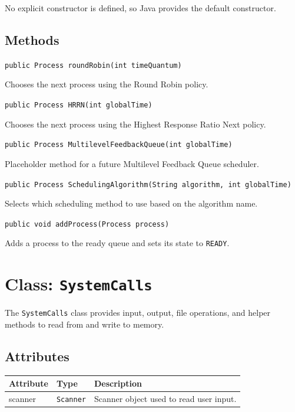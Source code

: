 \documentclass[12pt,a4paper]{article}
\begin{document}
No explicit constructor is defined, so Java provides the default constructor.

\subsection{Methods}

\begin{signaturebox}
\texttt{public Process roundRobin(int timeQuantum)}
\end{signaturebox}
Chooses the next process using the Round Robin policy.

\begin{signaturebox}
\texttt{public Process HRRN(int globalTime)}
\end{signaturebox}
Chooses the next process using the Highest Response Ratio Next policy.

\begin{signaturebox}
\texttt{public Process MultilevelFeedbackQueue(int globalTime)}
\end{signaturebox}
Placeholder method for a future Multilevel Feedback Queue scheduler.

\begin{signaturebox}
\texttt{public Process SchedulingAlgorithm(String algorithm, int globalTime)}
\end{signaturebox}
Selects which scheduling method to use based on the algorithm name.

\begin{signaturebox}
\texttt{public void addProcess(Process process)}
\end{signaturebox}
Adds a process to the ready queue and sets its state to \texttt{READY}.

\section{Class: \texttt{SystemCalls}}

\begin{purposebox}
The \texttt{SystemCalls} class provides input, output, file operations, and helper methods to read from and write to memory.
\end{purposebox}

\subsection{Attributes}

\begin{tabularx}{\textwidth}{p{4cm} p{3cm} Y}
\toprule
\textbf{Attribute} & \textbf{Type} & \textbf{Description} \\
\midrule
scanner & \texttt{Scanner} & Scanner object used to read user input. \\
\bottomrule
\end{tabularx}
\end{document}
